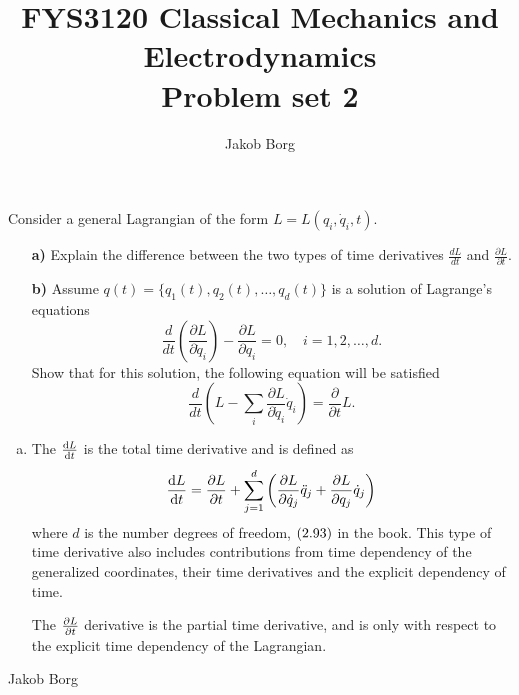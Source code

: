\documentclass[11pt,a4paper]{report}
\title{FYS3120 Classical Mechanics and Electrodynamics\\ 
\vspace{15mm}Problem set 2}
\author{Jakob Borg}
\newcounter{excount}[chapter]
\newenvironment{exercise}[1][]{\addtocounter{excount}{1} \noindent {\bf Problem
    \arabic{excount} \ \ #1}\hspace{2mm}}{\vspace{4mm}}
\newenvironment{solution}
    {\begin{tcolorbox}[title=Solution,halign lower=right,breakable]
    }
    {
    \tcblower Jakob Borg
    \end{tcolorbox}
	\vspace{5mm}
    }
\begin{document}

\maketitle


\begin{exercise}
Consider a general Lagrangian of the form $L=L(q_i,\dot q_i,t)$.

\begin{itemize}
\item[\bf a)] Explain the difference between the two types of time derivatives $\frac{dL}{dt}$ and $\frac{\partial L}{\partial t}$.
\item[\bf b)] Assume $q(t)=\{q_1(t),q_2(t),\ldots,q_d(t)\}$ is a solution of Lagrange's equations
\begin{equation}
\frac{d}{dt}\left(\frac{\partial L}{\partial \dot q_i}\right)-\frac{\partial L}{\partial q_i}=0,\quad i=1,2,\ldots,d.
\end{equation}
Show that for this solution, the following equation will be satisfied
\begin{equation}
\frac{d}{dt}\left(L-\sum_i\frac{\partial L}{\partial \dot q_i}\dot q_i\right)=\frac{\partial}{\partial t}L.
\end{equation}
\end{itemize}

\begin{solution}
\begin{enumerate}[a)]
	\item The $\dv{L}{t}$ is the total time derivative and is defined as
	\begin{equation}
	\dv{L}{t} =  \pdv{L}{t} + \sum_{j=1}^d \qty(\pdv{L}{\dot{q}_j}\ddot{q}_j+ \pdv{L}{q_j} \dot{q}_j)
	\end{equation}
	where $d$ is the number degrees of freedom, $\qty(2.93)$ in the book. This type of time derivative also includes contributions from time dependency of the generalized coordinates, their time derivatives and the explicit dependency of time.
	
	The $\pdv{L}{t}$ derivative is the partial time derivative, and is only with respect to the explicit time dependency of the Lagrangian.
	

\end{enumerate}
\end{solution}
\end{exercise}
\end{document}
